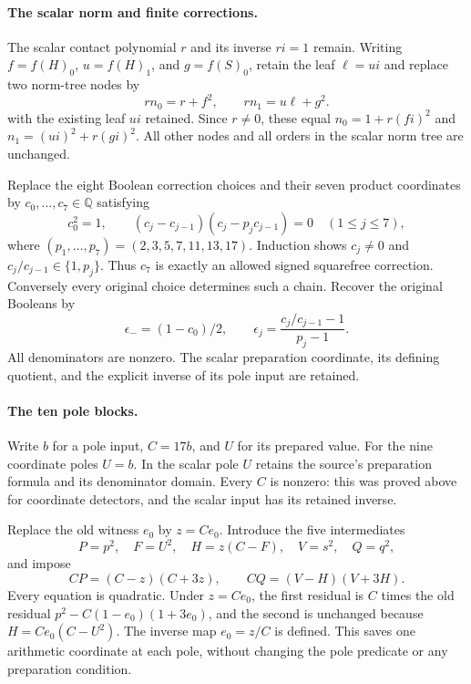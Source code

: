 \documentclass[11pt]{article}
\theoremstyle{definition}
\theoremstyle{remark}
\newcommand{\Q}{\mathbb Q}
\begin{document}
\paragraph{The scalar norm and finite corrections.}
The scalar contact polynomial $r$ and its inverse $ri=1$ remain.
Writing $f=f(H)_0$, $u=f(H)_1$, and $g=f(S)_0$, retain the leaf
$\ell=ui$ and replace two norm-tree
nodes by
\[
 rn_0=r+f^2,\qquad rn_1=u\ell+g^2.
\]
with the existing leaf $ui$ retained. Since $r\ne0$, these equal
$n_0=1+r(fi)^2$ and $n_1=(ui)^2+r(gi)^2$. All other nodes and all
orders in the scalar norm tree are unchanged.

Replace the eight Boolean correction choices and their seven product
coordinates by $c_0,\ldots,c_7\in\Q$ satisfying
\begin{equation}\label{eq:v6-correction-chain}
 c_0^2=1,\qquad
 (c_j-c_{j-1})(c_j-p_jc_{j-1})=0\quad(1\le j\le7),
\end{equation}
where $(p_1,\ldots,p_7)=(2,3,5,7,11,13,17)$. Induction shows
$c_j\ne0$ and $c_j/c_{j-1}\in\{1,p_j\}$. Thus $c_7$ is exactly an
allowed signed squarefree correction. Conversely every original
choice determines such a chain. Recover the original Booleans by
\[
 \epsilon_-=(1-c_0)/2,\qquad
 \epsilon_j=\frac{c_j/c_{j-1}-1}{p_j-1}.
\]
All denominators are nonzero. The scalar preparation coordinate,
its defining quotient, and the explicit inverse of its pole input
are retained.

\paragraph{The ten pole blocks.}
Write $b$ for a pole input, $C=17b$, and $U$ for its prepared value.
For the nine coordinate poles $U=b$. In the scalar pole $U$ retains
the source's preparation formula and its denominator domain.
Every $C$ is nonzero: this was proved above for coordinate detectors,
and the scalar input has its retained inverse.

Replace the old witness $e_0$ by $z=Ce_0$. Introduce the five
intermediates
\[
 P=p^2,\quad F=U^2,\quad H=z(C-F),\quad V=s^2,\quad Q=q^2,
\]
and impose
\begin{equation}\label{eq:v6-scaled-poles}
 CP=(C-z)(C+3z),\qquad CQ=(V-H)(V+3H).
\end{equation}
Every equation is quadratic. Under $z=Ce_0$, the first residual is
$C$ times the old residual $p^2-C(1-e_0)(1+3e_0)$, and the second
is unchanged because $H=Ce_0(C-U^2)$. The inverse map $e_0=z/C$
is defined. This saves one arithmetic coordinate at each pole,
without changing the pole predicate or any preparation condition.
\end{document}
